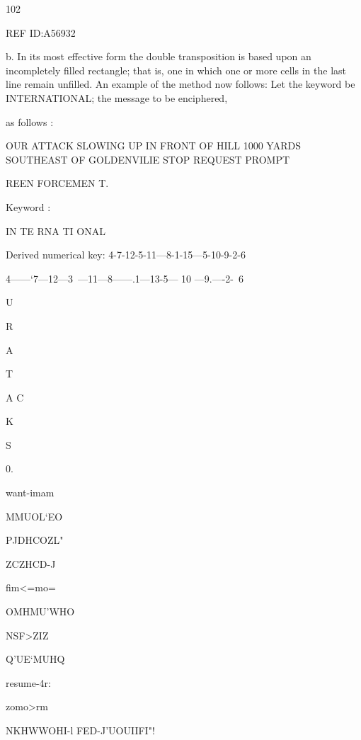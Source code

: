 {102

 

 

 

 

REF ID:A56932

b. In its most effective form the double transposition is based upon
an incompletely ﬁlled rectangle; that is, one in which one or more cells
in the last line remain unﬁlled. An example of the method now follows:
Let the keyword be INTERNATIONAL; the message to be enciphered,

as follows :

OUR ATTACK SLOWING UP IN FRONT OF HILL 1000 YARDS
SOUTHEAST OF GOLDENVILIE STOP REQUEST PROMPT

REEN FORCEMEN T.

Keyword :

IN TE RNA TI ONAL

Derived numerical key: 4-7-12-5-11—8-1-15—5-10-9-2-6

4——‘7—12—3~—11—8——.1—13-5— 10 —9.—-2-~6

 

U

R

A

T

A C

K

S

0.

 

 

 

 

 

 

want-imam

MMUOL‘EO

PJDHCOZL"

ZCZHCD-J

ﬁm<=mo=

 

OMHMU’WHO

 

 

NSF>ZIZ

 

Q’UE‘MUHQ

 

resume-4r:

 

zomo>rm

 

NKHWWOHI-l
FED-J'UOUIIFI"!

}
